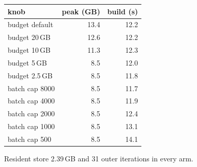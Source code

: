 {\small
\begin{tabular}{lrr}
\toprule
knob & peak (GB) & build (s) \\
\midrule
budget default & 13.4 & 12.2 \\
budget 20\,GB & 12.6 & 12.2 \\
budget 10\,GB & 11.3 & 12.3 \\
budget 5\,GB & 8.5 & 12.0 \\
budget 2.5\,GB & 8.5 & 11.8 \\
\midrule
batch cap 8000 & 8.5 & 11.7 \\
batch cap 4000 & 8.5 & 11.9 \\
batch cap 2000 & 8.5 & 12.4 \\
batch cap 1000 & 8.5 & 13.1 \\
batch cap 500 & 8.5 & 14.1 \\
\bottomrule
\end{tabular}
\par\smallskip
{\footnotesize Resident store 2.39\,GB and 31 outer iterations in every arm.}
}
